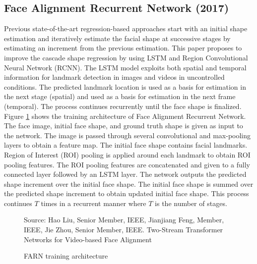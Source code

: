 \documentclass{llncs}
\begin{document}
\subsection{Face Alignment Recurrent Network (2017) \textcolor{green}{\cite{farn}}}

Previous state-of-the-art regression-based approaches start with an initial shape estimation and iteratively estimate the facial shape at successive stages by estimating an increment from the previous estimation. This paper proposes to improve the cascade shape regression by using LSTM and Region Convolutional Neural Network (RCNN). The LSTM model exploits both spatial and temporal information for landmark detection in images and videos in uncontrolled conditions. The predicted landmark location is used as a basis for estimation in the next stage (spatial) and used as a basis for estimation in the next frame (temporal). The process continues recurrently until the face shape is finalized. 
Figure \textcolor{red}{\ref{farn_training}} shows the training architecture of Face Alignment Recurrent Network. The face image, initial face shape, and ground truth shape is given as input to the network. The image is passed through several convolutional and max-pooling layers to obtain a feature map. The initial face shape contains facial landmarks. Region of Interest (ROI) pooling is applied around each landmark to obtain ROI pooling features. The ROI pooling features are concatenated and given to a fully connected layer followed by an LSTM layer. The network outputs the predicted shape increment over the initial face shape. The initial face shape is summed over the predicted shape increment to obtain updated initial face shape. This process continues $T$ times in a recurrent manner where $T$ is the number of stages.

\begin{figure}
%
{Source: Hao Liu, Senior Member, IEEE, Jianjiang Feng, Member, IEEE, Jie Zhou, Senior Member, IEEE. Two-Stream Transformer Networks for Video-based Face Alignment}
\caption{FARN training architecture}
\label{farn_training}
\end{figure}
\end{document}
